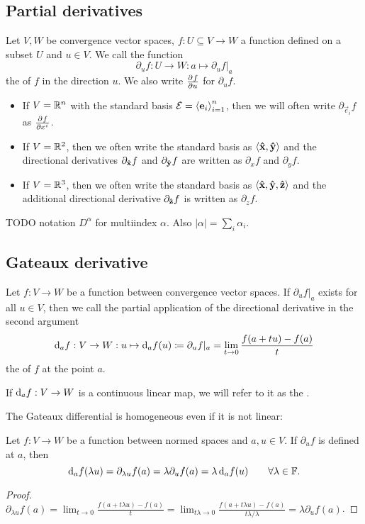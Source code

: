 \subsection{Partial derivatives}
\begin{definition}
Let $V,W$ be convergence vector spaces, $f:U\subseteq V\to W$ a function defined on a subset $U$ and $u\in V$.
We call the function
\[ \partial_u f: U\to W: a\mapsto \partial_u f|_a \]
the  of $f$ in the direction $u$. We also write $ \frac{\partial{^{}}f}{\partial{{u}^{}}} $ for $\partial_u f$.
\begin{itemize}
\item If $V = \mathbb{R}^n$ with the standard basis $\mathcal{E} = \left\langle \boldsymbol{\mathrm{e}}_i \right\rangle_{i=1}^n$, then we will often write $\partial_{\vec{e}_i}f$ as $ \frac{\partial{^{}}f}{\partial{{x^i}^{}}} $.
\item If $V = \mathbb{R}^2$, then we often write the standard basis as $\left\langle \boldsymbol{\mathrm{\hat{x}}}, \boldsymbol{\mathrm{\hat{y}}} \right\rangle$ and the directional derivatives $\partial_{\boldsymbol{\mathrm{\hat{x}}}}f$ and $\partial_{\boldsymbol{\mathrm{\hat{y}}}}f$ are written as $\partial_{x}f$ and $\partial_{y}f$.
\item If $V = \mathbb{R}^3$, then we often write the standard basis as $\left\langle \boldsymbol{\mathrm{\hat{x}}}, \boldsymbol{\mathrm{\hat{y}}}, \boldsymbol{\mathrm{\hat{z}}} \right\rangle$ and the additional directional derivative $\partial_{\boldsymbol{\mathrm{\hat{z}}}}f$ is written as $\partial_{z}f$.
\end{itemize}
\end{definition}
TODO notation $D^\alpha$ for multiindex $\alpha$. Also $|\alpha| = \sum_i \alpha_i$.


\subsection{Gateaux derivative}
\begin{definition}
Let $f:V\to W$ be a function between convergence vector spaces. If $\partial_u f|_a$ exists for all $u\in V$, then we call the partial application of the directional derivative in the second argument
\[ \operatorname{d \!}{_af}: V\to W: u\mapsto \operatorname{d \!}{_af}(u) \coloneqq \partial_u f|_a = \lim_{t\to 0} \frac{f(a+tu) - f(a)}{t} \]
the  of $f$ at the point $a$.

If $\operatorname{d \!}{_af}: V\to W$ is a continuous linear map, we will refer to it as the .
\end{definition}
The Gateaux differential is homogeneous even if it is not linear:
\begin{lemma} \label{GateauxDifferentialHomogeneous}
Let $f:V\to W$ be a function between normed spaces and $a,u\in V$. If $\partial_u f$ is defined at $a$, then
\[ \operatorname{d \!}{_a f}(\lambda u) = \partial_{\lambda u}f(a) = \lambda\partial_u f(a) = \lambda \operatorname{d \!}{_a f}(u) \qquad \forall \lambda\in\mathbb{F}. \]
\end{lemma}
\begin{proof}
$\partial_{\lambda u}f(a) = \lim_{t\to 0} \frac{f(a+t\lambda u) - f(a)}{t} = \lim_{t\lambda\to 0} \frac{f(a+t\lambda u) - f(a)}{t \lambda / \lambda} = \lambda\partial_u f(a)$.
\end{proof}



